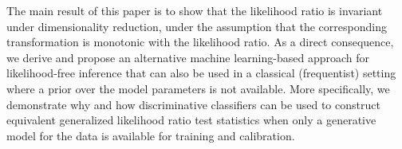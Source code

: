 \documentclass[12pt]{article}
\numberwithin{equation}{section}
\theoremstyle{plain}
\begin{document}
The main result of this paper is to show that the likelihood ratio is invariant
under dimensionality reduction, under the assumption that the corresponding
transformation is monotonic with the likelihood ratio. As a direct consequence,
we derive and propose an alternative machine learning-based approach for
likelihood-free inference that can also be used in a classical (frequentist)
setting where a prior over the model parameters is not available. More
specifically, we demonstrate why and how discriminative classifiers can be used
to construct equivalent generalized likelihood ratio test statistics when only a generative model for
the data is available for training and calibration.

%
%
%
\end{document}
